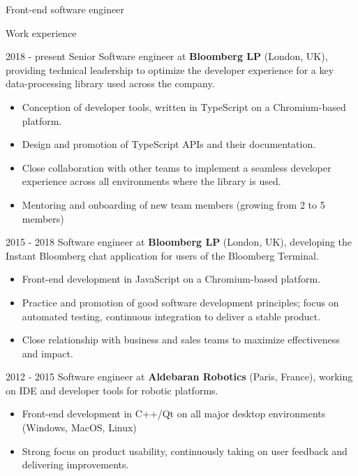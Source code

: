 \documentclass{article}
\begin{document}
\begin{cv}{Front-end software engineer}

\vskip 3mm

\begin{cvlist}{Work experience}
    \item[2018 - present] Senior Software engineer at \textbf{Bloomberg LP}
      (London, UK), providing technical leadership to optimize the developer
      experience for a key data-processing library used across the company.

      \begin{itemize}
      \item Conception of developer tools, written in TypeScript on a Chromium-based platform.
      \item Design and promotion of TypeScript APIs and their documentation.
      \item Close collaboration with other teams to implement a seamless developer experience across all environments where the library is used.
      \item Mentoring and onboarding of new team members (growing from 2 to 5 members)
      \end{itemize}

    \item[2015 - 2018] Software engineer at \textbf{Bloomberg LP} (London, UK),
      developing the Instant Bloomberg chat application for users of the Bloomberg
      Terminal.

      \begin{itemize}
      \item Front-end development in JavaScript on a Chromium-based platform.

      \item Practice and promotion of good software development principles; focus on
      automated testing, continuous integration to deliver a stable product.

      \item Close relationship with business and sales teams to maximize effectiveness and impact.
      \end{itemize}

    \item[2012 - 2015] Software engineer at \textbf{Aldebaran Robotics}
      (Paris, France), working on IDE and developer tools for robotic platforms.

      \begin{itemize}
      \item Front-end development in C++/Qt on all major desktop environments (Windows, MacOS, Linux)
      \item Strong focus on product usability, continuously taking on user
      feedback and delivering improvements.


\end{itemize}
\end{cvlist}
\end{cv}
\end{document}
